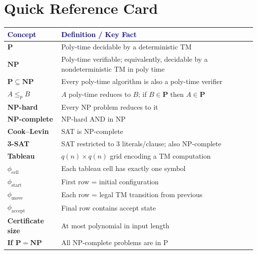 \documentclass[12pt,a4paper]{article}
\newcommand{\P}{\mathbf{P}}
\newcommand{\NP}{\mathbf{NP}}
\newcommand{\leqp}{\leq_p}
\begin{document}
\newpage

\appendix
\section{Quick Reference Card}

\begin{center}
\renewcommand{\arraystretch}{1.5}
\begin{tabular}{>{\bfseries\color{darkblue}}p{3.5cm} p{8cm}}
\toprule
\textcolor{darkblue}{Concept} & \textcolor{darkblue}{Definition / Key Fact} \\
\midrule
$\P$ & Poly-time decidable by a deterministic TM \\
$\NP$ & Poly-time verifiable; equivalently, decidable by a nondeterministic TM in poly time \\
$\P \subseteq \NP$ & Every poly-time algorithm is also a poly-time verifier \\
$A \leqp B$ & $A$ poly-time reduces to $B$; if $B \in \P$ then $A \in \P$ \\
NP-hard & Every NP problem reduces to it \\
NP-complete & NP-hard AND in NP \\
Cook--Levin & SAT is NP-complete \\
3-SAT & SAT restricted to 3 literals/clause; also NP-complete \\
Tableau & $q(n) \times q(n)$ grid encoding a TM computation \\
$\phi_\text{cell}$ & Each tableau cell has exactly one symbol \\
$\phi_\text{start}$ & First row = initial configuration \\
$\phi_\text{move}$ & Each row = legal TM transition from previous \\
$\phi_\text{accept}$ & Final row contains accept state \\
Certificate size & At most polynomial in input length \\
If $\P = \NP$ & All NP-complete problems are in P \\
\bottomrule
\end{tabular}
\end{center}

\vspace{1cm}
\end{document}
